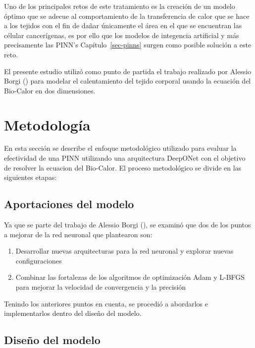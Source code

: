 \documentclass[
  spanish,
  us-letterpaper,
  DIV=11,
  numbers=noendperiod]{scrreprt}
\providecommand{\tightlist}{%
  \setlength{\itemsep}{0pt}\setlength{\parskip}{0pt}}
\theoremstyle{plain}
\theoremstyle{definition}
\theoremstyle{remark}
\begin{document}
Uno de los principales retos de este tratamiento es la creación de un
modelo óptimo que se adecue al comportamiento de la transferencia de
calor que se hace a los tejidos con el fin de dañar únicamente el área
en el que se encuentran las célular cancerígenas, es por ello que los
modelos de integencia artificial y más precisamente las PINN's
Capítulo~\ref{sec-pinns} surgen como posible solución a este reto.

El presente estudio utilizó como punto de partida el trabajo realizado
por Alessio Borgi () para modelar el
calentamiento del tejido corporal usando la ecuación del Bio-Calor en
dos dimensiones.

\chapter{Metodología}\label{metodologuxeda}

En esta sección se describe el enfoque metodológico utilizado para
evaluar la efectividad de una PINN utilizando una arquitectura DeepONet
con el objetivo de resolver la ecuacion del Bio-Calor. El proceso
metodológico se divide en las siguientes etapas:

\section{Aportaciones del modelo}\label{aportaciones-del-modelo}

Ya que se parte del trabajo de Alessio Borgi
(), se examinó que dos de los puntos a
mejorar de la red neuronal que plantearon son:

\begin{enumerate}
\def\labelenumi{\arabic{enumi}.}
\tightlist
\item
  Desarrollar nuevas arquitecturas para la red neuronal y explorar
  nuevas configuraciones
\item
  Combinar las fortalezas de los algoritmos de optimización Adam y
  L-BFGS para mejorar la velocidad de convergencia y la precisión
\end{enumerate}

Tenindo los anteriores puntos en cuenta, se procedió a abordarlos e
implementarlos dentro del diseño del modelo.

\section{Diseño del modelo}\label{diseuxf1o-del-modelo}
\end{document}
